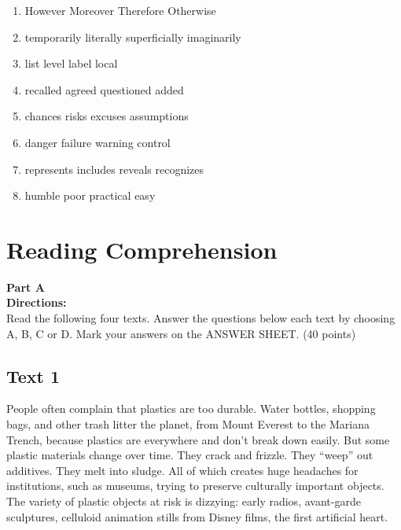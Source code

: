 \begin{enumerate}
\item

\fourchoices
{However}
{Moreover}
{Therefore}
{Otherwise}


\item
\fourchoices
{temporarily}
{literally}
{superficially}
{imaginarily}


\item

\fourchoices
{list}
{level}
{label}
{local}


\item

\fourchoices
{recalled}
{agreed}
{questioned}
{added}


\item

\fourchoices
{chances}
{risks}
{excuses}
{assumptions}


\item

\fourchoices
{danger}
{failure}
{warning}
{control}



\item

\fourchoices
{represents}
{includes}
{reveals}
{recognizes}


\item

\fourchoices
{humble}
{poor}
{practical}
{easy}


\end{enumerate}


\vfil

\section{Reading Comprehension}


\noindent
\textbf{Part A}\\
\textbf{Directions:}\\
Read the following four texts. Answer the questions below each text by
choosing A, B, C or
D. Mark your
answers on the ANSWER SHEET. (40 points)





\newpage

\subsection{Text 1}

People often complain that plastics are too durable. Water
bottles, shopping bags, and other trash litter the
planet, from Mount Everest to the Mariana Trench, because plastics are
everywhere and don't break down easily.
But some plastic materials change over time. They crack and frizzle.
They ``weep'' out additives. They melt into
sludge. All of which creates huge headaches for institutions, such as
museums, trying to preserve culturally
important objects. The variety of plastic objects at risk is dizzying:
early radios, avant-garde sculptures, celluloid
animation stills from Disney films, the first artificial heart.


